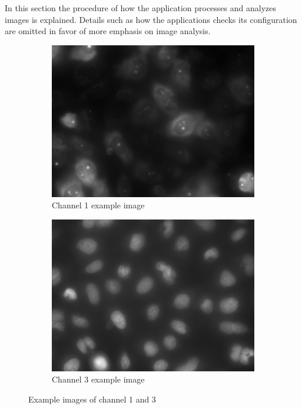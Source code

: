\documentclass[a4paper, 12pt]{article}
\begin{document}
In this section the procedure of how the application processes and analyzes
images is explained. Details such as how the applications checks its
configuration are omitted in favor of more emphasis on image analysis.

\begin{figure}[h]
\centering
\begin{subfigure}[b]{0.48\textwidth}
\includegraphics[width=\textwidth]{images/example_Kanal1}
\caption{Channel 1 example image}
\end{subfigure}
\begin{subfigure}[b]{0.48\textwidth}
\includegraphics[width=\textwidth]{images/example_Kanal3}
\caption{Channel 3 example image}
\label{fig:channel3}
\end{subfigure}
\caption{Example images of channel 1 and 3}
\label{fig:example_images}
\end{figure}
\end{document}
